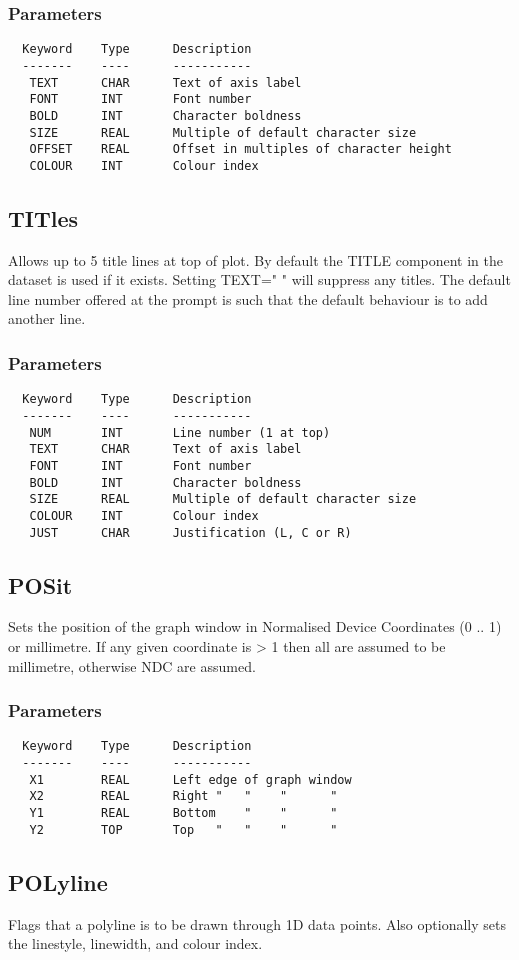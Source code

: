 \documentclass{book}
\renewcommand{\_}{{\tt\char'137}}     %
\begin{document}
\subsubsection{Parameters}
\begin{verbatim}
  Keyword    Type      Description
  -------    ----      -----------
   TEXT      CHAR      Text of axis label
   FONT      INT       Font number
   BOLD      INT       Character boldness
   SIZE      REAL      Multiple of default character size
   OFFSET    REAL      Offset in multiples of character height
   COLOUR    INT       Colour index
\end{verbatim}\subsection{TITles}
Allows up to 5 title lines at top of plot. By default the TITLE
component in the dataset is used if it exists. Setting TEXT=" "
will suppress any titles. The default line number offered at the
prompt is such that the default behaviour is to add another line.
 
\subsubsection{Parameters}
\begin{verbatim}
  Keyword    Type      Description
  -------    ----      -----------
   NUM       INT       Line number (1 at top)
   TEXT      CHAR      Text of axis label
   FONT      INT       Font number
   BOLD      INT       Character boldness
   SIZE      REAL      Multiple of default character size
   COLOUR    INT       Colour index
   JUST      CHAR      Justification (L, C or R)
\end{verbatim}\subsection{POSit}
Sets the position of the graph window in Normalised Device
Coordinates (0 .. 1) or millimetre. If any given coordinate
is > 1 then all are assumed to be millimetre, otherwise NDC
are assumed.
 
\subsubsection{Parameters}
\begin{verbatim}
  Keyword    Type      Description
  -------    ----      -----------
   X1        REAL      Left edge of graph window
   X2        REAL      Right "   "    "      "
   Y1        REAL      Bottom    "    "      "
   Y2        TOP       Top   "   "    "      "
\end{verbatim}\subsection{POLyline}
Flags that a polyline is to be drawn through 1D data points.
Also optionally sets the linestyle, linewidth, and
colour index.
 
\end{document}
